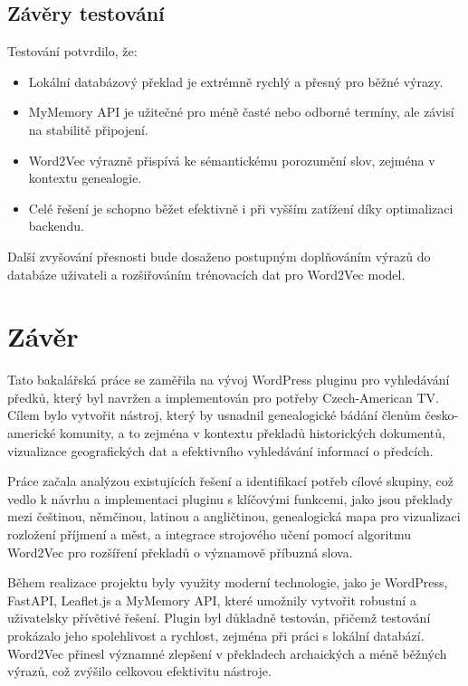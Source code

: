 \documentclass[czech, ba, kiv, he]{fasthesis}
\begin{document}
\section{Závěry testování}

Testování potvrdilo, že:

\begin{itemize}
    \item Lokální databázový překlad je extrémně rychlý a přesný pro běžné výrazy.
    \item MyMemory API je užitečné pro méně časté nebo odborné termíny, ale závisí na stabilitě připojení.
    \item Word2Vec výrazně přispívá ke sémantickému porozumění slov, zejména v kontextu genealogie.
    \item Celé řešení je schopno běžet efektivně i při vyšším zatížení díky optimalizaci backendu.
\end{itemize}

Další zvyšování přesnosti bude dosaženo postupným doplňováním výrazů do databáze uživateli a rozšiřováním trénovacích dat pro Word2Vec model.





\chapter{Závěr}
Tato bakalářská práce se zaměřila na vývoj WordPress pluginu pro vyhledávání předků, který byl navržen a implementován pro potřeby Czech-American TV. Cílem bylo vytvořit nástroj, který by usnadnil genealogické bádání členům česko-americké komunity, a to zejména v kontextu překladů historických dokumentů, vizualizace geografických dat a efektivního vyhledávání informací o předcích.

Práce začala analýzou existujících řešení a identifikací potřeb cílové skupiny, což vedlo k návrhu a implementaci pluginu s klíčovými funkcemi, jako jsou překlady mezi češtinou, němčinou, latinou a angličtinou, genealogická mapa pro vizualizaci rozložení příjmení a měst, a integrace strojového učení pomocí algoritmu Word2Vec pro rozšíření překladů o významově příbuzná slova.

Během realizace projektu byly využity moderní technologie, jako je WordPress, FastAPI, Leaflet.js a MyMemory API, které umožnily vytvořit robustní a uživatelsky přívětivé řešení. Plugin byl důkladně testován, přičemž testování prokázalo jeho spolehlivost a rychlost, zejména při práci s lokální databází. Word2Vec přinesl významné zlepšení v překladech archaických a méně běžných výrazů, což zvýšilo celkovou efektivitu nástroje.
\end{document}
